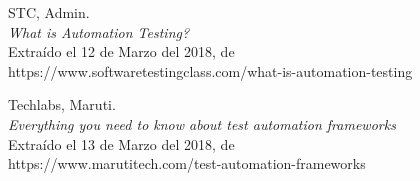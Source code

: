 \begin{thebibliography}{99}
 STC, Admin.\\
\emph{What is Automation Testing?}\\
Extraído el 12 de Marzo del 2018, de\\
https://www.softwaretestingclass.com/what-is-automation-testing

 Techlabs, Maruti.\\
\emph{Everything you need to know about test automation frameworks}\\
Extraído el 13 de Marzo del 2018, de\\
https://www.marutitech.com/test-automation-frameworks

\end{thebibliography}

